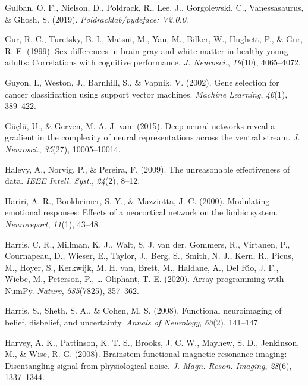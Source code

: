 \documentclass[12pt,american,a4paper,oneside,]{memoir} %
\begin{document}
\leavevmode\hypertarget{ref-Gulban2019-sv}{}%
Gulban, O. F., Nielson, D., Poldrack, R., Lee, J., Gorgolewski, C., Vanessasaurus, \& Ghosh, S. (2019). \emph{Poldracklab/pydeface: V2.0.0}.

\leavevmode\hypertarget{ref-Gur1999-qj}{}%
Gur, R. C., Turetsky, B. I., Matsui, M., Yan, M., Bilker, W., Hughett, P., \& Gur, R. E. (1999). Sex differences in brain gray and white matter in healthy young adults: Correlations with cognitive performance. \emph{J. Neurosci.}, \emph{19}(10), 4065--4072.

\leavevmode\hypertarget{ref-guyon2002gene}{}%
Guyon, I., Weston, J., Barnhill, S., \& Vapnik, V. (2002). Gene selection for cancer classification using support vector machines. \emph{Machine Learning}, \emph{46}(1), 389--422.

\leavevmode\hypertarget{ref-Guclu2015-qj}{}%
Güçlü, U., \& Gerven, M. A. J. van. (2015). Deep neural networks reveal a gradient in the complexity of neural representations across the ventral stream. \emph{J. Neurosci.}, \emph{35}(27), 10005--10014.

\leavevmode\hypertarget{ref-Halevy2009-cv}{}%
Halevy, A., Norvig, P., \& Pereira, F. (2009). The unreasonable effectiveness of data. \emph{IEEE Intell. Syst.}, \emph{24}(2), 8--12.

\leavevmode\hypertarget{ref-Hariri2000-sc}{}%
Hariri, A. R., Bookheimer, S. Y., \& Mazziotta, J. C. (2000). Modulating emotional responses: Effects of a neocortical network on the limbic system. \emph{Neuroreport}, \emph{11}(1), 43--48.

\leavevmode\hypertarget{ref-Harris2020-en}{}%
Harris, C. R., Millman, K. J., Walt, S. J. van der, Gommers, R., Virtanen, P., Cournapeau, D., Wieser, E., Taylor, J., Berg, S., Smith, N. J., Kern, R., Picus, M., Hoyer, S., Kerkwijk, M. H. van, Brett, M., Haldane, A., Del Rı́o, J. F., Wiebe, M., Peterson, P., \ldots{} Oliphant, T. E. (2020). Array programming with NumPy. \emph{Nature}, \emph{585}(7825), 357--362.

\leavevmode\hypertarget{ref-harris2008functional}{}%
Harris, S., Sheth, S. A., \& Cohen, M. S. (2008). Functional neuroimaging of belief, disbelief, and uncertainty. \emph{Annals of Neurology}, \emph{63}(2), 141--147.

\leavevmode\hypertarget{ref-Harvey2008-nt}{}%
Harvey, A. K., Pattinson, K. T. S., Brooks, J. C. W., Mayhew, S. D., Jenkinson, M., \& Wise, R. G. (2008). Brainstem functional magnetic resonance imaging: Disentangling signal from physiological noise. \emph{J. Magn. Reson. Imaging}, \emph{28}(6), 1337--1344.
\end{document}

